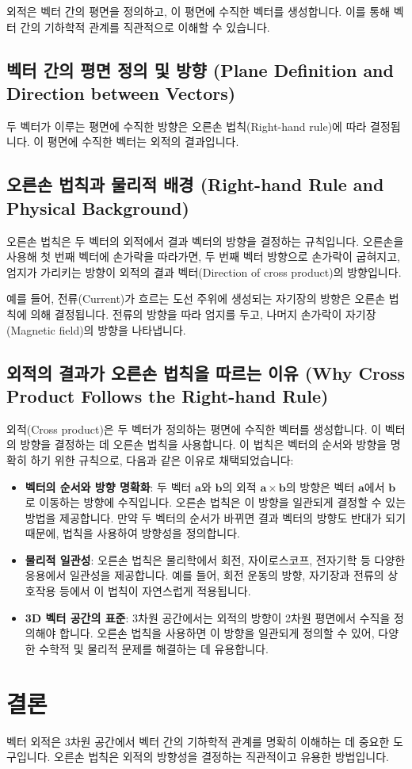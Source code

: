 \documentclass[12pt]{article}
\begin{document}
\noindent 외적은 벡터 간의 평면을 정의하고, 이 평면에 수직한 벡터를 생성합니다. 이를 통해 벡터 간의 기하학적 관계를 직관적으로 이해할 수 있습니다.

\subsection{벡터 간의 평면 정의 및 방향 (Plane Definition and Direction between Vectors)}

\noindent 두 벡터가 이루는 평면에 수직한 방향은 오른손 법칙(Right-hand rule)에 따라 결정됩니다. 이 평면에 수직한 벡터는 외적의 결과입니다.

\subsection{오른손 법칙과 물리적 배경 (Right-hand Rule and Physical Background)}

\noindent 오른손 법칙은 두 벡터의 외적에서 결과 벡터의 방향을 결정하는 규칙입니다. 오른손을 사용해 첫 번째 벡터에 손가락을 따라가면, 두 번째 벡터 방향으로 손가락이 굽혀지고, 엄지가 가리키는 방향이 외적의 결과 벡터(Direction of cross product)의 방향입니다.

예를 들어, 전류(Current)가 흐르는 도선 주위에 생성되는 자기장의 방향은 오른손 법칙에 의해 결정됩니다. 전류의 방향을 따라 엄지를 두고, 나머지 손가락이 자기장(Magnetic field)의 방향을 나타냅니다.

\subsection{외적의 결과가 오른손 법칙을 따르는 이유 (Why Cross Product Follows the Right-hand Rule)}

외적(Cross product)은 두 벡터가 정의하는 평면에 수직한 벡터를 생성합니다. 이 벡터의 방향을 결정하는 데 오른손 법칙을 사용합니다. 이 법칙은 벡터의 순서와 방향을 명확히 하기 위한 규칙으로, 다음과 같은 이유로 채택되었습니다:

\begin{itemize}
  \item \textbf{벡터의 순서와 방향 명확화}: 두 벡터 \(\mathbf{a}\)와 \(\mathbf{b}\)의 외적 \(\mathbf{a} \times \mathbf{b}\)의 방향은 벡터 \(\mathbf{a}\)에서 \(\mathbf{b}\)로 이동하는 방향에 수직입니다. 오른손 법칙은 이 방향을 일관되게 결정할 수 있는 방법을 제공합니다. 만약 두 벡터의 순서가 바뀌면 결과 벡터의 방향도 반대가 되기 때문에, 법칙을 사용하여 방향성을 정의합니다.
  \item \textbf{물리적 일관성}: 오른손 법칙은 물리학에서 회전, 자이로스코프, 전자기학 등 다양한 응용에서 일관성을 제공합니다. 예를 들어, 회전 운동의 방향, 자기장과 전류의 상호작용 등에서 이 법칙이 자연스럽게 적용됩니다.
  \item \textbf{3D 벡터 공간의 표준}: 3차원 공간에서는 외적의 방향이 2차원 평면에서 수직을 정의해야 합니다. 오른손 법칙을 사용하면 이 방향을 일관되게 정의할 수 있어, 다양한 수학적 및 물리적 문제를 해결하는 데 유용합니다.
\end{itemize}

\section{결론}

\noindent 벡터 외적은 3차원 공간에서 벡터 간의 기하학적 관계를 명확히 이해하는 데 중요한 도구입니다. 오른손 법칙은 외적의 방향성을 결정하는 직관적이고 유용한 방법입니다.
\end{document}

